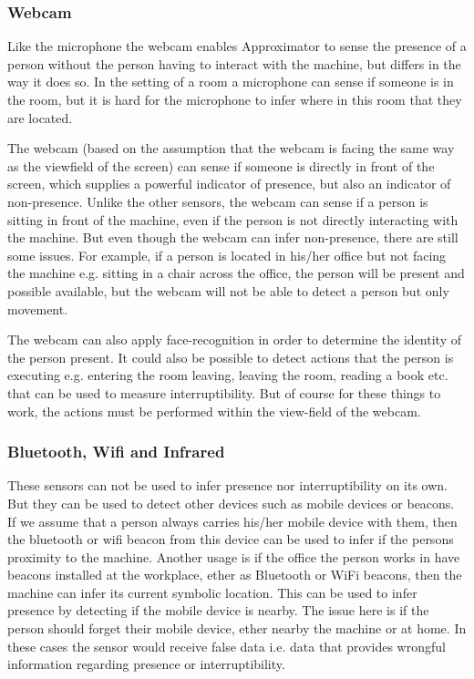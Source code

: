\documentclass{sigchi}
\begin{document}
\subsubsection{Webcam}
Like the microphone the webcam enables Approximator to sense the presence of a person without the person having to interact with the machine, but differs in the way it does so.
In the setting of a room a microphone can sense if someone is in the room, but it is hard for the microphone to infer where in this room that they are located.

The webcam (based on the assumption that the webcam is facing the same way as the viewfield of the screen) can sense if someone is directly in front of the screen, which supplies a powerful indicator of presence, but also an indicator of non-presence.
Unlike the other sensors, the webcam can sense if a person is sitting in front of the machine, even if the person is not directly interacting with the machine.
But even though the webcam can infer non-presence, there are still some issues.
For example, if a person is located in his/her office but not facing the machine e.g. sitting in a chair across the office, the person will be present and possible available, but the webcam will not be able to detect a person but only movement.

The webcam can also apply face-recognition in order to determine the identity of the person present.
It could also be possible to detect actions that the person is executing e.g. entering the room leaving, leaving the room, reading a book etc. that can be used to measure interruptibility.
But of course for these things to work, the actions must be performed within the view-field of the webcam.

\subsubsection{Bluetooth, Wifi and Infrared}
These sensors can not be used to infer presence nor interruptibility on its own.
But they can be used to detect other devices such as mobile devices or beacons.
If we assume that a person always carries his/her mobile device with them, then the bluetooth or wifi beacon from this device can be used to infer if the persons proximity to the machine.
Another usage is if the office the person works in have beacons installed at the workplace, ether as Bluetooth or WiFi beacons, then the machine can infer its current symbolic location.
This can be used to infer presence by detecting if the mobile device is nearby.
The issue here is if the person should forget their mobile device, ether nearby the machine or at home.
In these cases the sensor would receive false data i.e. data that provides wrongful information regarding presence or interruptibility.
\end{document}
